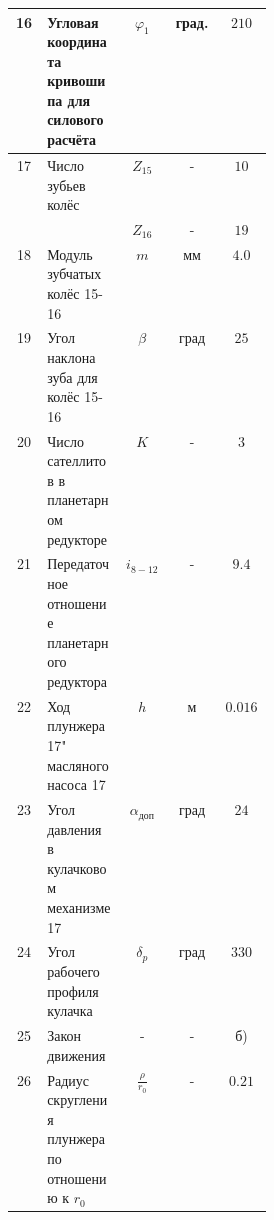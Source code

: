 \begin{tabular}{|c|p{0.3\linewidth}|c|c|c|}
	\hline 
	16 & Угловая координата кривошипа для силового расчёта & $\varphi_1$ & град. & $210$ \\ 
	\hline 
	17 & Число зубьев колёс & $Z_{15}$ & - & $10$ \\ 
	\hline 
	&   & $Z_{16}$ & - & $19$ \\ 
	\hline 
	18 &  Модуль зубчатых колёс 15-16 & $m$ & мм & $4.0$ \\ 
	\hline 
	19 &  Угол наклона зуба для колёс 15-16 & $\beta$ & град & $25$ \\ 
	\hline 
	20 &  Число сателлитов в планетарном редукторе & $K$ & - & $3$ \\ 
	\hline 
	21 &  Передаточное отношение планетарного редуктора & $i_{8-12}$ & - & $9.4$ \\ 
	\hline 
	22 &   Ход плунжера 17" масляного насоса 17 & $h$ & м & $0.016$ \\ 
	\hline 
	23 &  Угол давления в кулачковом механизме 17 & $\alpha_{\text{доп}}$ & град & $24$ \\ 
	\hline 
	24 &  Угол рабочего профиля кулачка & $\delta_p$ & град & $330$ \\ 
	\hline 
	25 &  Закон движения & - & - & б) \\ 
	\hline 
	26 &  Радиус скругления плунжера по отношению к $r_0$ & $\frac{\rho}{r_0}$ & - & $0.21$ \\ 
	\hline 
\end{tabular} 

\normalsize